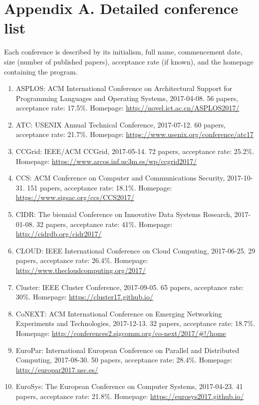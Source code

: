 \documentclass{article}
\begin{document}
\hypertarget{appendix-a.-detailed-conference-list}{%
\section*{Appendix A. Detailed conference list}\label{appendix-a.-detailed-conference-list}}

Each conference is described by its initialism, full name, commencement date, size (number of published papers), acceptance rate (if known), and the homepage containing the program.

\begin{enumerate}
\item ASPLOS: ACM International Conference on Architectural Support for Programming Languages and Operating Systems, 2017-04-08. 56 papers, acceptance rate: 17.5\%. Homepage: \url{http://novel.ict.ac.cn/ASPLOS2017/}
\item ATC: USENIX Annual Technical Conference, 2017-07-12. 60 papers, acceptance rate: 21.7\%. Homepage: \url{https://www.usenix.org/conference/atc17}
\item CCGrid: IEEE/ACM CCGrid, 2017-05-14. 72 papers, acceptance rate: 25.2\%. Homepage: \url{https://www.arcos.inf.uc3m.es/wp/ccgrid2017/}
\item CCS: ACM Conference on Computer and Communications Security, 2017-10-31. 151 papers, acceptance rate: 18.1\%. Homepage: \url{https://www.sigsac.org/ccs/CCS2017/}
\item CIDR: The biennial Conference on Innovative Data Systems Research, 2017-01-08. 32 papers, acceptance rate: 41\%. Homepage: \url{http://cidrdb.org/cidr2017/}
\item CLOUD: IEEE International Conference on Cloud Computing, 2017-06-25. 29 papers, acceptance rate: 26.4\%. Homepage: \url{http://www.thecloudcomputing.org/2017/}
\item Cluster: IEEE Cluster Conference, 2017-09-05. 65 papers, acceptance rate: 30\%. Homepage: \url{https://cluster17.github.io/}
\item CoNEXT: ACM International Conference on Emerging Networking Experiments and Technologies, 2017-12-13. 32 papers, acceptance rate: 18.7\%. Homepage: \url{http://conferences2.sigcomm.org/co-next/2017/#!/home}
\item EuroPar: International European Conference on Parallel and Distributed Computing, 2017-08-30. 50 papers, acceptance rate: 28.4\%. Homepage: \url{http://europar2017.usc.es/}
\item EuroSys: The European Conference on Computer Systems, 2017-04-23. 41 papers, acceptance rate: 21.8\%. Homepage: \url{https://eurosys2017.github.io/}

\end{enumerate}
\end{document}

